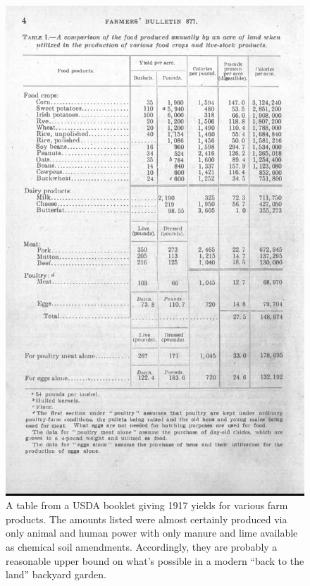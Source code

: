 \documentclass[11pt,letter]{article}
\begin{document}
%
\begin{figure}[ht!]
\centering
\includegraphics[width=\columnwidth]{USDA_1917_cropped.pdf}
\caption{
A table from a USDA booklet giving 1917 yields for various farm products.  
The amounts listed were almost certainly produced via only animal and human power with only manure and lime available as chemical soil amendments.  Accordingly, they are probably a reasonable upper bound on what's possible in a modern ``back to the land'' backyard garden. }
\label{1917_yields}
\end{figure}
\end{document}
